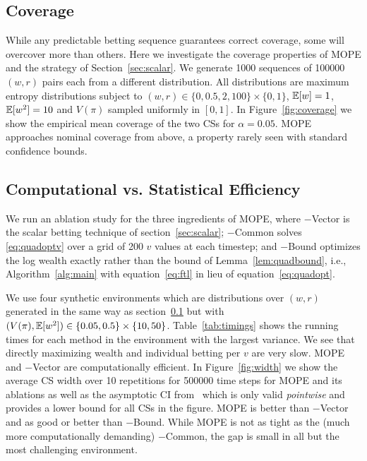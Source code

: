 \subsection{Coverage} \label{sec:coverage}

While any predictable betting sequence
guarantees correct coverage, some will overcover more than
others. Here we investigate the coverage properties of
MOPE and the strategy of Section~\ref{sec:scalar}.
We generate 1000 sequences of 100000 $(w,r)$ pairs each from a different
distribution. All distributions are maximum entropy distributions subject to
$(w,r) \in \{0, 0.5, 2, 100\} \times \{0,1\}$, $\mathbb{E}[w]=1$, $\mathbb{E}[w^2]=10$
and $V(\pi)$ sampled uniformly in $[0,1]$. In Figure~\ref{fig:coverage} we show
the empirical mean coverage of the two CSs for $\alpha=0.05$. 
MOPE approaches nominal coverage from above,
a property rarely seen with standard confidence bounds.

\subsection{Computational vs. Statistical Efficiency}

We run an ablation study for the three ingredients of MOPE, where
{\sf $-$Vector} is the scalar betting technique of section~\ref{sec:scalar}; {\sf $-$Common} solves \eqref{eq:quadoptv} over a grid of 200 $v$ values at each timestep;
and {\sf $-$Bound} optimizes the log wealth exactly rather than the bound of Lemma~\ref{lem:quadbound}, i.e., Algorithm~\ref{alg:main} with equation~\eqref{eq:ftl} in lieu of equation~\eqref{eq:quadopt}.

We use four synthetic environments which are distributions over $(w,r)$ generated in the same way as section~\ref{sec:coverage} but
with $(V(\pi),\mathbb{E}[w^2]) \in \{0.05, 0.5\} \times \{10, 50\}$.
Table~\ref{tab:timings}
shows the running times for each method in the environment with 
the largest variance. We see that directly 
maximizing wealth and individual betting per $v$ are very slow.
MOPE and {\sf $-$Vector} are computationally efficient.
In Figure~\ref{fig:width} we show the 
average CS width over 10 repetitions for 500000 time steps
for MOPE and its ablations as well as the 
asymptotic CI from~\citet{karampatziakis2019empirical}
which is only valid \emph{pointwise} and provides a lower bound for
all CSs in the figure. MOPE is better than {\sf $-$Vector} 
and as good or better than {\sf $-$Bound}.
While MOPE is not as tight as
the (much more computationally demanding) 
{\sf $-$Common}, the gap is small in all 
but the most challenging environment.

